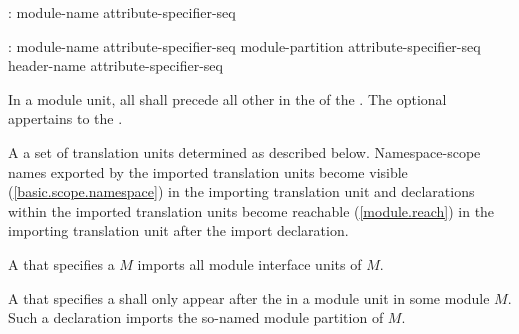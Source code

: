 \begin{std.txt}\color{addclr}
\begin{before}
  \begin{bnf}\color{addclr}
    :\br
       module-name attribute-specifier-seq\opt {} \terminal{;}
  \end{bnf}
\end{before}\begin{after}
  \begin{bnf}\color{addclr}
    :\br
      \opt{}  module-name attribute-specifier-seq\opt {} \terminal{;}\br
      \opt{}  module-partition attribute-specifier-seq\opt {} \terminal{;}\br
      \opt{}  header-name attribute-specifier-seq\opt {} \terminal{;}
  \end{bnf}
\end{after}

  \pnum
  In a module unit, all 
  shall precede all other  in
  the  of the
  .
The optional 
appertains to the .

  \pnum
  A   a set of
  translation units determined as described below.
  \enternote
  Namespace-scope names exported by the imported translation units
  become visible (\ref{basic.scope.namespace})
  in the importing translation unit
  and declarations within the imported translation units
  become reachable (\ref{module.reach})
  in the importing translation unit
  after the import declaration.
  \exitnote

  \pnum
  A  that specifies
  a  $M$
  imports all module interface units of $M$.

  \pnum
  A  that specifies
  a  shall only appear after
  the  in a module unit in
  some module $M$.
  Such a declaration imports the so-named
  module partition of $M$.


\end{std.txt}
